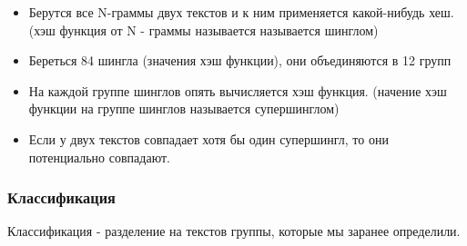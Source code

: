 \begin {itemize}
\item Берутся все N-граммы двух текстов и к ним применяется какой-нибудь хеш. (хэш функция от N - граммы называется называется шинглом)
\item Береться 84 шингла (значения хэш функции), они объединяются в 12 групп
\item На каждой группе шинглов опять вычисляется хэш функция. (начение хэш функции на группе шинглов называется супершинглом)
\item Если у двух текстов совпадает хотя бы один супершингл,  то они потенциально совпадают.
\end {itemize}

\subsubsection {Классификация}
Классификация - разделение на текстов группы, которые мы заранее определили.


